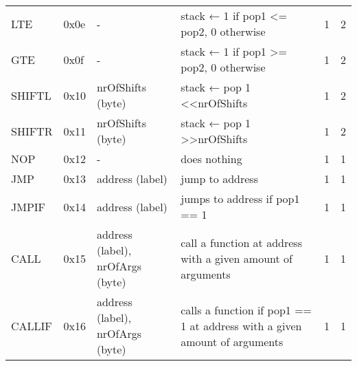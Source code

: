\begin{longtable}[c]{L{2.5cm} L{1cm} L{3cm} L{5.5cm} R{0.8cm} R{1cm} }
LTE       & 0x0e   & -                                                                                                        & stack ← 1 if pop1 \textless{}= pop2, 0 otherwise                                                            & 1         & 2          \\
GTE       & 0x0f   & -                                                                                                        & stack ← 1 if pop1 \textgreater{}= pop2, 0 otherwise                                                         & 1         & 2          \\
SHIFTL    & 0x10   & nrOfShifts (byte)                                                                                        & stack ← pop 1 \textless{}\textless nrOfShifts                                                               & 1         & 2          \\
SHIFTR    & 0x11   & nrOfShifts (byte)                                                                                        & stack ← pop 1 \textgreater{}\textgreater nrOfShifts                                                         & 1         & 2          \\
NOP       & 0x12   & -                                                                                                        & does nothing                                                                                                & 1         & 1          \\
JMP       & 0x13   & address (label)                                                                                          & jump to address                                                                                             & 1         & 1          \\
JMPIF     & 0x14   & address (label)                                                                                          & jumps to address if pop1 == 1                                                                               & 1         & 1          \\
CALL      & 0x15   & address (label), nrOfArgs (byte)                                                                         & call a function at address with a given amount of arguments                                                 & 1         & 1          \\
CALLIF    & 0x16   & address (label), nrOfArgs (byte)                                                                         & calls a function if pop1 == 1 at address with a given amount of arguments                                   & 1         & 1          \\

\end{longtable}
